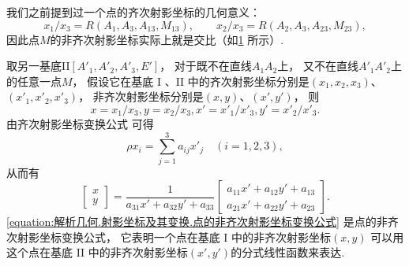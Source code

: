 我们之前提到过一个点的齐次射影坐标的几何意义：\begin{equation*}
	x_1 / x_3 = R(A_1,A_3,A_{13},M_{13}),
	\qquad
	x_2 / x_3 = R(A_2,A_3,A_{23},M_{23}),
\end{equation*}
因此点\(M\)的非齐次射影坐标实际上就是交比（如\cref{definition:解析几何.射影坐标及其变换.点的非齐次射影坐标} 所示）.

\begin{figure}[hbt]
	\centering
	\caption{}
	\label{definition:解析几何.射影坐标及其变换.点的非齐次射影坐标}
\end{figure}

取另一基底II\([A'_1,A'_2,A'_3,E']\)，
对于既不在直线\(A_1A_2\)上，
又不在直线\(A'_1A'_2\)上的任意一点\(M\)，
假设它在基底 I 、II 中的齐次射影坐标分别是\((x_1,x_2,x_3)\)、\((x'_1,x'_2,x'_3)\)，
非齐次射影坐标分别是\((x,y)\)、\((x',y')\)，
则\begin{equation*}
	x = x_1 / x_3,
	y = x_2 / x_3,
	x' = x'_1 / x'_3,
	y' = x'_2 / x'_3.
\end{equation*}
由齐次射影坐标变换公式  可得\begin{equation*}
	\rho x_i = \sum_{j=1}^3 a_{ij} x'_j
	\quad(i=1,2,3),
\end{equation*}
从而有\begin{equation}\label{equation:解析几何.射影坐标及其变换.点的非齐次射影坐标变换公式}
	\begin{bmatrix}
		x \\ y
	\end{bmatrix}
	= \frac1{a_{31} x' + a_{32} y' + a_{33}}
	\begin{bmatrix}
		a_{11} x' + a_{12} y' + a_{13} \\
		a_{21} x' + a_{22} y' + a_{23}
	\end{bmatrix}.
\end{equation}
\cref{equation:解析几何.射影坐标及其变换.点的非齐次射影坐标变换公式}
是点的非齐次射影坐标变换公式，
它表明一个点在基底 I 中的非齐次射影坐标\((x,y)\)
可以用这个点在基底 II 中的非齐次射影坐标\((x',y')\)的分式线性函数来表达.
